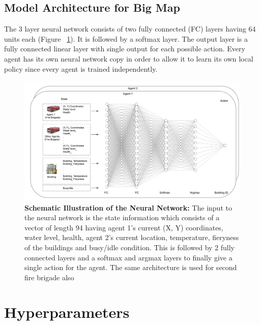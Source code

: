 \documentclass[12pt]{report}
\begin{document}
\subsection{Model Architecture for Big Map} The 3 layer neural network consists of two fully connected (FC) layers having 64 units each (Figure ~\ref{fig:27}). It is followed by a softmax layer. The output layer is a fully connected linear layer with single output for each possible action. Every agent has its own neural network copy in order to allow it to learn its own local policy since every agent is trained independently. 

\begin{figure}[!h]
    \centering
    \includegraphics[width=14cm]{27}
    \caption{\textbf{Schematic Illustration of the Neural Network:} The input to the neural network is the state information which consists of a vector of length 94 having agent 1's current (X, Y) coordinates, water level, health, agent 2's current location, temperature, fieryness of the buildings and busy/idle condition. This is followed by 2 fully connected layers and a softmax and argmax layers to finally give a single action for the agent. The same architecture is used for second fire brigade also}
    \label{fig:27}
\end{figure}

\section{Hyperparameters}
\end{document}

